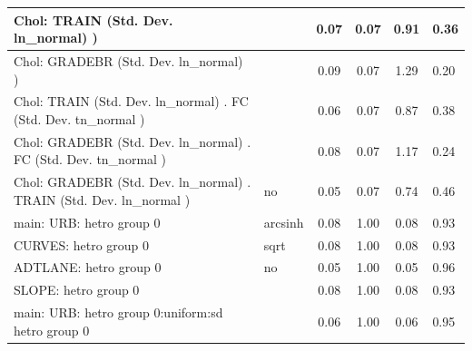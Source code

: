 \begin{table}
\begin{center}
\begin{tabular}{|l|l|c|c|c|l|}
			\hline
			 Chol: TRAIN (Std. Dev. ln_normal) ) &  & 0.07 & 0.07 & 0.91 & 0.36 \\
			\hline
			 Chol: GRADEBR (Std. Dev. ln_normal) ) &  & 0.09 & 0.07 & 1.29 & 0.20 \\
			\hline
			 Chol: TRAIN (Std. Dev. ln_normal) . FC (Std. Dev.   tn_normal ) &  & 0.06 & 0.07 & 0.87 & 0.38 \\
			\hline
			 Chol: GRADEBR (Std. Dev. ln_normal) . FC (Std. Dev.   tn_normal ) &  & 0.08 & 0.07 & 1.17 & 0.24 \\
			\hline
			 Chol: GRADEBR (Std. Dev. ln_normal) . TRAIN (Std. Dev.   ln_normal ) & no & 0.05 & 0.07 & 0.74 & 0.46 \\
			\hline
			main: URB: hetro group 0 & arcsinh & 0.08 & 1.00 & 0.08 & 0.93 \\
			\hline
			CURVES: hetro group 0 & sqrt & 0.08 & 1.00 & 0.08 & 0.93 \\
			\hline
			ADTLANE: hetro group 0 & no & 0.05 & 1.00 & 0.05 & 0.96 \\
			\hline
			SLOPE: hetro group 0 &  & 0.08 & 1.00 & 0.08 & 0.93 \\
			\hline
			main: URB: hetro group 0:uniform:sd  hetro group 0 &  & 0.06 & 1.00 & 0.06 & 0.95 \\
			\hline
		\end{tabular}
	\end{center}
\end{table}